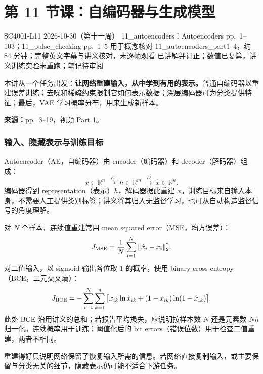 
\section{第 11 节课：自编码器与生成模型}
\label{lecture:SC4001-L11}

\lecturemeta
  {SC4001-L11}
  {2026-10-30（第十一周）}
  {11\_autoencoders：Autoencoders}
  {pp.~1--103；11\_pulse\_checking pp.~1--5 用于概念核对}
  {11\_autoencoders\_part1--4，约 84 分钟；完整英文字幕与讲义核对，未逐帧观看}
  {已讲解并订正；数值已复算，讲义训练实验未重跑；笔记待审阅}

本讲从一个任务出发：\textbf{让网络重建输入，从中学到有用的表示。}普通自编码器以重建误差训练；去噪和稀疏约束限制它如何表示数据；深层编码器可为分类提供特征；最后，VAE 学习概率分布，用来生成新样本。


\textbf{来源：}pp.~3--19，视频 Part 1。

\subsubsection{输入、隐藏表示与训练目标}

Autoencoder（AE，自编码器）由 encoder（编码器）和 decoder（解码器）组成：
\[
 x\in\mathbb R^n\ \xrightarrow{E}\ h\in\mathbb R^m
 \ \xrightarrow{D}\ \hat x\in\mathbb R^n.
\]
编码器得到 representation（表示）$h$，解码器据此重建 $x$。训练目标来自输入本身，不需要人工提供类别标签；讲义将其归入无监督学习，也可从自动构造监督信号的角度理解。

对 $N$ 个样本，连续值重建常用 mean squared error（MSE，均方误差）：
\[
 J_{\rm MSE}=\frac1N\sum_{i=1}^N\|\hat x_i-x_i\|_2^2.
\]
对二值输入，以 sigmoid 输出各位取 $1$ 的概率，使用 binary cross-entropy（BCE，二元交叉熵）：
\[
 J_{\rm BCE}=-\sum_{i=1}^N\sum_{k=1}^n
 \big[x_{ik}\ln\hat x_{ik}+(1-x_{ik})\ln(1-\hat x_{ik})\big].
\]
此处 BCE 沿用讲义的总和；若报告平均损失，应说明按样本数 $N$ 还是元素数 $Nn$ 归一化。连续概率用于训练；阈值化后的 bit errors（错误位数）用于检查二值重建，两者不相同。

重建得好只说明网络保留了恢复输入所需的信息。若网络直接复制输入，或主要保留与分类无关的细节，隐藏表示仍可能不适合下游任务。

